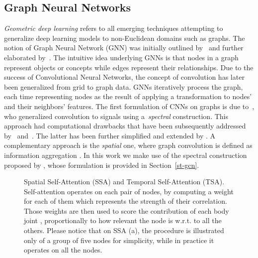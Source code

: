 \documentclass[review]{cvpr}
\begin{document}
\subsection{Graph Neural Networks} 
\textit{Geometric deep learning} \cite{DBLP:journals/corr/BronsteinBLSV16} refers to all emerging techniques attempting to generalize deep learning models to non-Euclidean domains such as graphs. The notion of Graph Neural Network (GNN) was initially outlined by~\cite{Gori2005ANM} and further elaborated by~\cite{Scarselli2009TheGN}. The intuitive idea underlying GNNs is that nodes in a graph represent objects or concepts while edges represent their relationships. Due to the success of Convolutional Neural Networks, the concept of convolution has later been generalized from grid to graph data. GNNs iteratively process the graph, each time representing nodes as the result of applying a transformation to nodes' and their neighbors' features. The first formulation of CNNs on graphs is due to~\cite{ae482107de73461787258f805cf8f4ed}, who generalized convolution to signals using a~\textit{spectral} construction. This approach had computational drawbacks that have been subsequently addressed by~\cite{DBLP:journals/corr/HenaffBL15} and~\cite{DBLP:journals/corr/DefferrardBV16}. The latter has been further simpliﬁed and extended by \cite{Kipf:2016tc}. A complementary approach is the \textit{spatial} one, where graph convolution is defined as information aggregation \cite{article7,DBLP:journals/corr/NiepertAK16,DBLP:journals/corr/SuchSDPZMCP17}. In this work we make use of the spectral construction proposed by \cite{Kipf:2016tc}, whose formulation is provided in Section~\ref{st-gcn}.
\begin{figure*}[t]
\begin{center}
\hspace{1cm}
\end{center}
\caption{{Spatial Self-Attention (SSA)} and {Temporal Self-Attention (TSA)}. Self-attention operates on each pair of nodes, by computing a weight for each of them which represents the strength of their correlation. Those weights are then used to score the contribution of each body joint , proportionally to how relevant the node is w.r.t. to all the others. Please notice that on SSA (a), the procedure is illustrated only of a group of five nodes for simplicity, while in practice it operates on all the nodes.}
\label{SSA_TSA}
\end{figure*}
\end{document}
